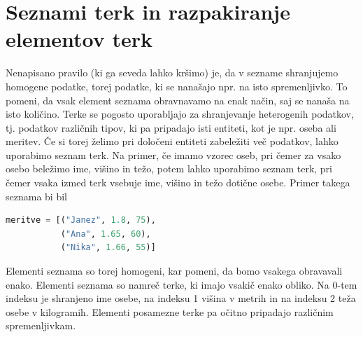 \section{Seznami terk in razpakiranje elementov terk}

Nenapisano pravilo (ki ga seveda lahko kršimo) je, da v sezname shranjujemo homogene podatke, torej podatke, ki se nanašajo npr. na isto spremenljivko. To pomeni, da vsak element seznama obravnavamo na enak način, saj se nanaša na isto količino. Terke se pogosto uporabljajo za shranjevanje heterogenih podatkov, tj. podatkov različnih tipov, ki pa pripadajo isti entiteti, kot je npr. oseba ali meritev. Če si torej želimo pri določeni entiteti zabeležiti več podatkov, lahko uporabimo seznam terk. Na primer, če imamo vzorec oseb, pri čemer za vsako osebo beležimo ime, višino in težo, potem lahko uporabimo seznam terk, pri čemer vsaka izmed terk vsebuje ime, višino in težo dotične osebe. Primer takega seznama bi bil
\begin{lstlisting}[language=Python]
meritve = [("Janez", 1.8, 75),
           ("Ana", 1.65, 60), 
           ("Nika", 1.66, 55)]
\end{lstlisting}
Elementi seznama so torej homogeni, kar pomeni, da bomo vsakega obravavali enako. Elementi seznama so namreč terke, ki imajo vsakič enako obliko. Na 0-tem indeksu je shranjeno ime osebe, na indeksu 1 višina v metrih in na indeksu 2 teža osebe v kilogramih. Elementi posamezne terke pa očitno pripadajo različnim spremenljivkam.

